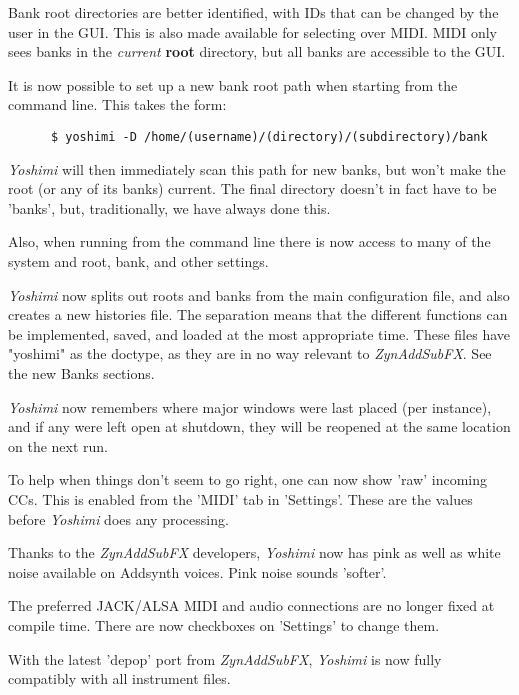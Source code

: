 \documentclass[
 11pt,
 twoside,
 a4paper,
 final                                 %
]{article}
\begin{document}
   Bank root directories are better identified, with IDs that can be changed by
   the user in the GUI. This is also made available for selecting over MIDI.
   MIDI only sees banks in the \textsl{current}
   \textbf{root} directory, but all banks are accessible to the GUI.

   It is now possible to set up a new bank root path when starting from the
   command line. This takes the form:

   \begin{verbatim}
      $ yoshimi -D /home/(username)/(directory)/(subdirectory)/bank
   \end{verbatim}

   \textsl{Yoshimi} will then immediately scan this path for new banks, but
   won't make the root (or any of its banks) current. The final directory
   doesn't in fact have to be 'banks', but, traditionally, we have always done
   this.

   Also, when running from the command line there is now access to many of the
   system and root, bank, and other settings.

	\textsl{Yoshimi} now splits out roots and banks from the main configuration
	file, and also creates a new histories file. The separation means that the
	different functions can be implemented, saved, and loaded at the most
   appropriate time. These files have
   "yoshimi" as the doctype, as they are in no way relevant to
   \textsl{ZynAddSubFX}.
   See the new Banks sections.

   \textsl{Yoshimi} now remembers where major windows were last placed (per
   instance), and if any were left open at shutdown, they will be reopened at
   the same location on the next run.

   To help when things don't seem to go right, one can now show 'raw' incoming
   CCs. This is enabled from the 'MIDI' tab in 'Settings'. These are the values
   before \textsl{Yoshimi} does any processing.

   Thanks to the \textsl{ZynAddSubFX} developers, \textsl{Yoshimi} now has pink
   as well as white noise available on Addsynth voices. Pink noise sounds
   'softer'.

   The preferred JACK/ALSA MIDI and audio connections are no longer fixed at
   compile time. There are now checkboxes on 'Settings' to change them.

   With the latest 'depop' port from \textsl{ZynAddSubFX}, \textsl{Yoshimi}
   is now fully compatibly with all instrument files.
\end{document}
